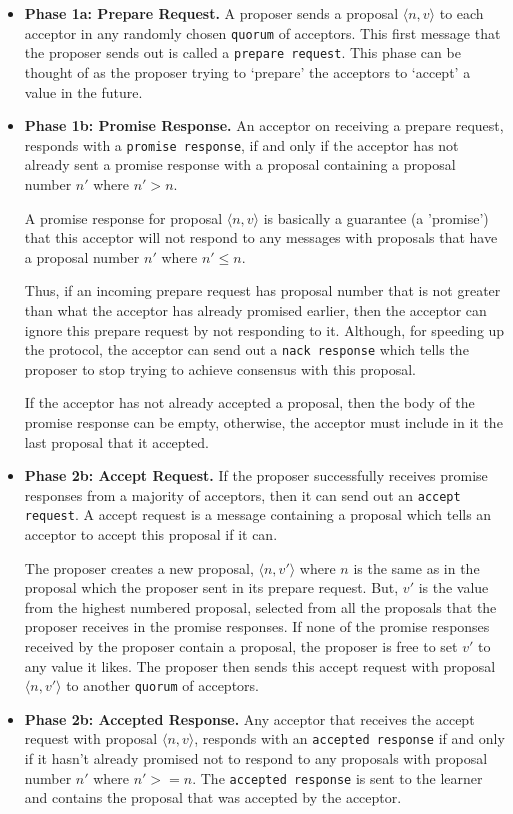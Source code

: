 \begin{itemize}
  \item \textbf{Phase 1a: Prepare Request.}
    A proposer sends a proposal
    $\langle n, v \rangle$ to each acceptor in any randomly chosen \texttt{quorum} of acceptors.
    This first message that the proposer sends out is called a \texttt{prepare request}.
    This phase can be thought of as the proposer trying to
    `prepare' the acceptors to `accept' a value in the future.
  \item \textbf{Phase 1b: Promise Response.}
    An acceptor on receiving a prepare request, responds with a \texttt{promise response},
    if and only if the acceptor has not already sent a promise response with
    a proposal containing a proposal number $n'$ where $n' > n$.

    A promise response for proposal $\langle n, v \rangle$ is basically a
    guarantee (a 'promise') that this acceptor will not respond to any
    messages with proposals that have a proposal number $n'$ where $n' \leq n$.

    Thus, if an incoming prepare request has proposal number that is not
    greater than what the
    acceptor has already promised earlier, then the acceptor can ignore this
    prepare request by not responding to it. Although, for speeding up the
    protocol, the acceptor can send out a \texttt{nack response} which tells the
    proposer to stop trying to achieve consensus with this proposal.

    If the acceptor has not already accepted a proposal, then the body of
    the promise response can be empty, otherwise, the acceptor must include in it the
    last proposal that it accepted.
  \item \textbf{Phase 2b: Accept Request.}
    If the proposer successfully receives promise responses from a majority of
    acceptors, then it can send out an \texttt{accept request}. A accept request is
    a message containing a proposal which tells an acceptor to accept this
    proposal if it can.

    The proposer creates a new proposal, $\langle n, v' \rangle$ where $n$ is
    the same as in the proposal which the proposer sent in its prepare request.
    But, $v'$ is the value from the highest numbered proposal, selected from all
    the proposals that the proposer receives in the promise responses.
    If none of the promise responses received by the proposer contain a proposal,
    the proposer is free to set $v'$ to any value it likes.
    The proposer then sends this accept request with proposal $\langle n, v' \rangle$
    to another \texttt{quorum} of acceptors.
  \item \textbf{Phase 2b: Accepted Response.}
    Any acceptor that receives the accept request with proposal $\langle n, v \rangle$,
    responds with an \texttt{accepted response} if and only if it hasn't already promised
    not to respond to any proposals with proposal number $n'$ where $n' >= n$.
    The \texttt{accepted response} is sent to the learner and contains the proposal
    that was accepted by the acceptor.
\end{itemize}

